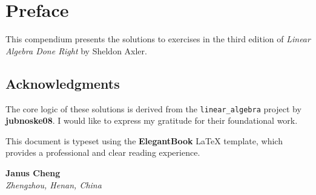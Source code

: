 \chapter*{Preface}

This compendium presents the solutions to exercises in the third edition of \textit{Linear Algebra Done Right} by Sheldon Axler.

\section*{Acknowledgments}
The core logic of these solutions is derived from the \texttt{linear\_algebra} project by \textbf{jubnoske08}. I would like to express my gratitude for their foundational work. 

This document is typeset using the \textbf{ElegantBook} \LaTeX{} template, which provides a professional and clear reading experience.

\vspace{2cm}
\begin{flushright}
    \textbf{Janus Cheng} \\
    \textit{Zhengzhou, Henan, China} \\
    \monthyear
\end{flushright}
